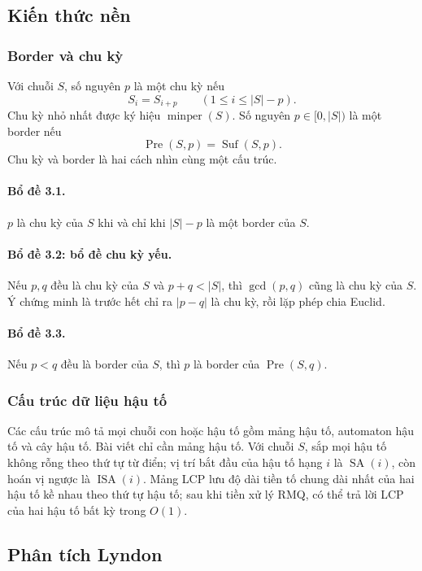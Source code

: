 \documentclass[11pt]{article}
\begin{document}
\subsection{Kiến thức nền}

\subsubsection{Border và chu kỳ}

Với chuỗi $S$, số nguyên $p$ là một chu kỳ nếu
\[
  S_i=S_{i+p}\qquad (1\le i\le |S|-p).
\]
Chu kỳ nhỏ nhất được ký hiệu $\operatorname{minper}(S)$. Số nguyên
$p\in[0,|S|)$ là một border nếu
\[
  \operatorname{Pre}(S,p)=\operatorname{Suf}(S,p).
\]
Chu kỳ và border là hai cách nhìn cùng một cấu trúc.

\paragraph{Bổ đề 3.1.}
$p$ là chu kỳ của $S$ khi và chỉ khi $|S|-p$ là một border của $S$.

\paragraph{Bổ đề 3.2: bổ đề chu kỳ yếu.}
Nếu $p,q$ đều là chu kỳ của $S$ và $p+q<|S|$, thì $\gcd(p,q)$ cũng là chu kỳ của
$S$. Ý chứng minh là trước hết chỉ ra $|p-q|$ là chu kỳ, rồi lặp phép chia
Euclid.

\paragraph{Bổ đề 3.3.}
Nếu $p<q$ đều là border của $S$, thì $p$ là border của
$\operatorname{Pre}(S,q)$.

\subsubsection{Cấu trúc dữ liệu hậu tố}

Các cấu trúc mô tả mọi chuỗi con hoặc hậu tố gồm mảng hậu tố, automaton hậu tố
và cây hậu tố. Bài viết chỉ cần mảng hậu tố. Với chuỗi $S$, sắp mọi hậu tố không
rỗng theo thứ tự từ điển; vị trí bắt đầu của hậu tố hạng $i$ là
$\operatorname{SA}(i)$, còn hoán vị ngược là $\operatorname{ISA}(i)$. Mảng LCP
lưu độ dài tiền tố chung dài nhất của hai hậu tố kề nhau theo thứ tự hậu tố; sau
khi tiền xử lý RMQ, có thể trả lời LCP của hai hậu tố bất kỳ trong $O(1)$.

\subsection{Phân tích Lyndon}
\end{document}
